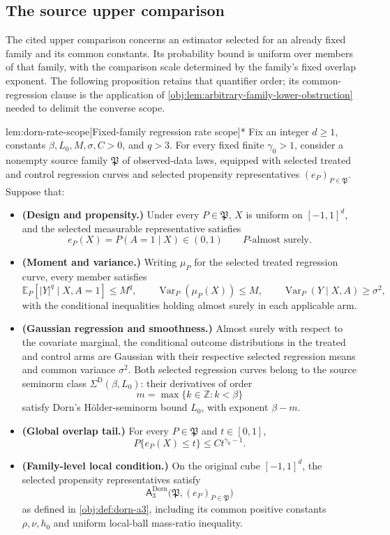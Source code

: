 \subsection{The source upper comparison}

The cited upper comparison concerns an estimator selected for an already fixed family and its common constants. Its probability bound is uniform over members of that family, with the comparison scale determined by the family's fixed overlap exponent. The following proposition retains that quantifier order; its common-regression clause is the application of \cref{obj:lem:arbitrary-family-lower-obstruction} needed to delimit the converse scope.

\begin{propositionv}{lem:dorn-rate-scope}[Fixed-family regression rate scope]*
Fix an integer \(d\ge1\), constants \(\beta,L_0,M,\sigma,C>0\), and \(q>3\). For every fixed finite \(\gamma_0>1\), consider a nonempty source family \(\mathfrak P\) of observed-data laws, equipped with selected treated and control regression curves and selected propensity representatives \((e_P)_{P\in\mathfrak P}\). Suppose that:
\begin{itemize}
\item \textbf{(Design and propensity.)} Under every \(P\in\mathfrak P\), \(X\) is uniform on \([-1,1]^d\), and the selected measurable representative satisfies
\[
e_P(X)=P(A=1\mid X)\in(0,1)
\qquad P\text{-almost surely}.
\]
\item \textbf{(Moment and variance.)} Writing \(\mu_P\) for the selected treated regression curve, every member satisfies
\[
\mathbb E_P\!\left[|Y|^q\mid X,A=1\right]\le M^q,\qquad
\operatorname{Var}_P\!\left(\mu_P(X)\right)\le M,\qquad
\operatorname{Var}_P(Y\mid X,A)\ge\sigma^2,
\]
with the conditional inequalities holding almost surely in each applicable arm.
\item \textbf{(Gaussian regression and smoothness.)} Almost surely with respect to the covariate marginal, the conditional outcome distributions in the treated and control arms are Gaussian with their respective selected regression means and common variance \(\sigma^2\). Both selected regression curves belong to the source seminorm class \(\Sigma^{\mathrm D}(\beta,L_0)\): their derivatives of order
\[
m=\max\{k\in\mathbb Z:k<\beta\}
\]
satisfy Dorn's Hölder-seminorm bound \(L_0\), with exponent \(\beta-m\).
\item \textbf{(Global overlap tail.)} For every \(P\in\mathfrak P\) and \(t\in[0,1]\),
\[
P\{e_P(X)\le t\}\le Ct^{\gamma_0-1}.
\]
\item \textbf{(Family-level local condition.)} On the original cube \([-1,1]^d\), the selected propensity representatives satisfy
\[
\mathsf A_{3}^{\mathrm{Dorn}}
\bigl(\mathfrak P,(e_P)_{P\in\mathfrak P}\bigr)
\]
as defined in \cref{obj:def:dorn-a3}, including its common positive constants \(\rho,\nu,h_0\) and uniform local-ball mass-ratio inequality.
\end{itemize}


\end{propositionv}
